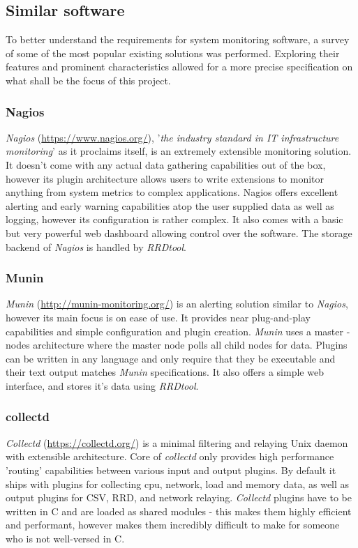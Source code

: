 \documentclass[12pt,a4paper,table]{article}
\begin{document}
        \subsection{Similar software}
            To better understand the requirements for system monitoring software, a survey of some of the most popular existing solutions was performed. Exploring their features and prominent characteristics allowed for a more precise specification on what shall be the focus of this project.

            \subsubsection{Nagios}
                \textit{Nagios} (\url{https://www.nagios.org/}), '\textit{the industry standard in IT infrastructure monitoring}' as it proclaims itself, is an extremely extensible monitoring solution. It doesn't come with any actual data gathering capabilities out of the box, however its plugin architecture allows users to write extensions to monitor anything from system metrics to complex applications. Nagios offers excellent alerting and early warning capabilities atop the user supplied data as well as logging, however its configuration is rather complex. It also comes with a basic but very powerful web dashboard allowing control over the software. The storage backend of \textit{Nagios} is handled by \textit{RRDtool}.
            \subsubsection{Munin}
                \textit{Munin} (\url{http://munin-monitoring.org/}) is an alerting solution similar to \textit{Nagios}, however its main focus is on ease of use. It provides near plug-and-play capabilities and simple configuration and plugin creation. \textit{Munin} uses a master - nodes architecture where
                the master node polls all child nodes for data. Plugins can be written in any language and only require that they be executable and their text output matches \textit{Munin} specifications. It also offers a simple web interface, and stores it's data using \textit{RRDtool}.
            \subsubsection{collectd}
                \textit{Collectd} (\url{https://collectd.org/}) is a minimal filtering and relaying Unix daemon with extensible architecture. Core of \textit{collectd} only provides high performance 'routing' capabilities between various input and output plugins. By default it ships with plugins for collecting cpu, network, load and memory data, as well as output plugins for CSV, RRD, and network relaying. \textit{Collectd} plugins have to be written in C and are loaded as shared modules - this makes them highly efficient and performant, however makes them incredibly difficult to make for someone who is not well-versed in C.
\end{document}
